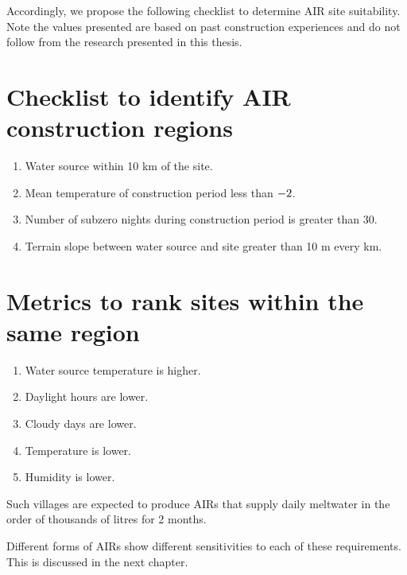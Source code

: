 Accordingly, we propose the following checklist to determine AIR site suitability. Note the values presented are
based on past construction experiences and do not follow from the research presented in this thesis.

\section{Checklist to identify AIR construction regions}

\begin{enumerate}

  \item Water source within 10 km of the site.
  \item Mean temperature of construction period less than $- 2 \degree C$.
  \item Number of subzero nights during construction period is greater than 30.
  \item Terrain slope between water source and site greater than 10 m every km. 

\end{enumerate}





\section{Metrics to rank sites within the same region }

\begin{enumerate}

  \item Water source temperature is higher.
  \item Daylight hours are lower.
  \item Cloudy days are lower.
  \item Temperature is lower.
  \item Humidity is lower.

\end{enumerate}

Such villages are expected to produce AIRs that supply daily meltwater in the order of thousands of litres for 2
months. 

Different forms of AIRs show different sensitivities to each of these requirements. This is discussed in the
next chapter.
